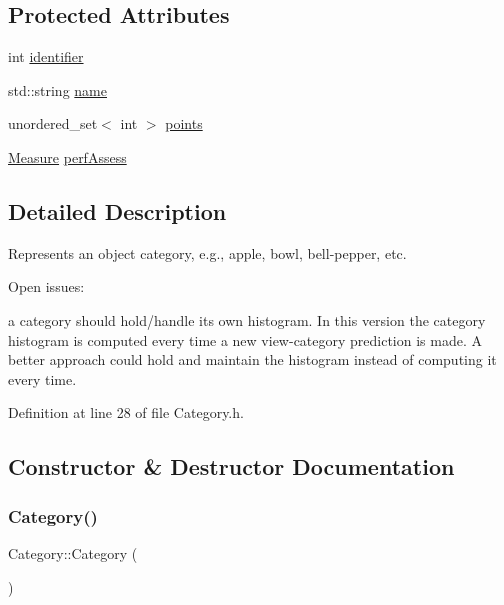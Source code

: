 \subsection*{Protected Attributes}
\begin{DoxyCompactItemize}
\item 
int \hyperlink{class_category_a10f4f758d6942ef39ca6d1cc5dfb6369}{identifier}
\item 
std\+::string \hyperlink{class_category_a433491cdb802174ee504a41eea7bc7c7}{name}
\item 
unordered\+\_\+set$<$ int $>$ \hyperlink{class_category_a9b83a3525cbe3c9e806ca10f7c39f51f}{points}
\item 
\hyperlink{class_measure}{Measure} \hyperlink{class_category_ae2153cae8cf1b7eded7625a40e45ab8c}{perf\+Assess}
\end{DoxyCompactItemize}


\subsection{Detailed Description}
Represents an object category, e.\+g., apple, bowl, bell-\/pepper, etc. 

Open issues\+:
\begin{DoxyItemize}
\item a category should hold/handle its\textquotesingle{} own histogram. In this version the category\textquotesingle{} histogram is computed every time a new view-\/category prediction is made. A better approach could hold and maintain the histogram instead of computing it every time. 
\end{DoxyItemize}

Definition at line 28 of file Category.\+h.



\subsection{Constructor \& Destructor Documentation}
\mbox{\label{class_category_adeee911f773db1ebeb1005a00da45e08}} 
\subsubsection{\texorpdfstring{Category()}{Category()}\hspace{0.1cm}{\footnotesize\ttfamily [1/2]}}
{\footnotesize\ttfamily Category\+::\+Category (\begin{DoxyParamCaption}{ }\end{DoxyParamCaption})}

